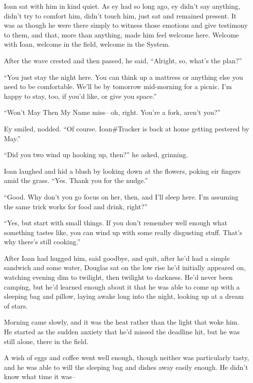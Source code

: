 Ioan sat with him in kind quiet. As ey had so long ago, ey didn't say anything, didn't try to comfort him, didn't touch him, just sat and remained present. It was as though he were there simply to witness those emotions and give testimony to them, and that, more than anything, made him feel welcome here. Welcome with Ioan, welcome in the field, welcome in the System.

After the wave crested and then passed, he said, ``Alright, so, what's the plan?''

``You just stay the night here. You can think up a mattress or anything else you need to be comfortable. We'll be by tomorrow mid-morning for a picnic. I'm happy to stay, too, if you'd like, or give you space.''

``Won't May Then My Name miss-- oh, right. You're a fork, aren't you?''

Ey smiled, nodded. ``Of course. Ioan\#Tracker is back at home getting pestered by May.''

``Did you two wind up hooking up, then?'' he asked, grinning.

Ioan laughed and hid a blush by looking down at the flowers, poking eir fingers amid the grass. ``Yes. Thank you for the nudge.''

``Good. Why don't you go focus on her, then, and I'll sleep here. I'm assuming the same trick works for food and drink, right?''

``Yes, but start with small things. If you don't remember well enough what something tastes like, you can wind up with some really disgusting stuff. That's why there's still cooking.''

After Ioan had hugged him, said goodbye, and quit, after he'd had a simple sandwich and some water, Douglas sat on the low rise he'd initially appeared on, watching evening dim to twilight, then twilight to darkness. He'd never been camping, but he'd learned enough about it that he was able to come up with a sleeping bag and pillow, laying awake long into the night, looking up at a dream of stars.

Morning came slowly, and it was the heat rather than the light that woke him. He started as the sudden anxiety that he'd missed the deadline hit, but he was still alone, there in the field.

A wish of eggs and coffee went well enough, though neither was particularly tasty, and he was able to will the sleeping bag and dishes away easily enough. He didn't know what time it was--

